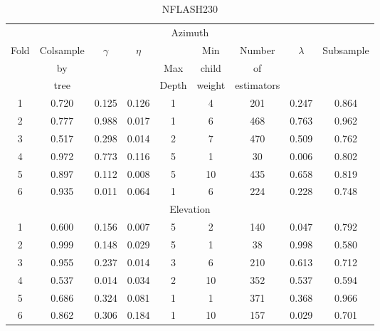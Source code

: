 \begin{table}[!htbp]
    \centering
    \caption{NFLASH230}
    \begin{tabular}{ccccccccc}
        \toprule
        \multicolumn{9}{c}{Azimuth} \\
        \cmidrule{1-9}
        \multirow{3}{*}{Fold} &  Colsample &  \multirow{3}{*}{$\gamma$} &  \multirow{3}{*}{$\eta$} &   &  Min &  Number &  \multirow{3}{*}{$\lambda$} &  \multirow{3}{*}{Subsample} \\
        & by   & & & Max   & child  & of         & & \\
        & tree & & & Depth & weight & estimators & & \\
        \midrule
        1 &      0.720 &  0.125 &          0.126 &      1 &             4 &       201 &       0.247 &      0.864 \\
        2 &      0.777 &  0.988 &          0.017 &      1 &             6 &       468 &       0.763 &      0.962 \\
        3 &      0.517 &  0.298 &          0.014 &      2 &             7 &       470 &       0.509 &      0.762 \\
        4 &      0.972 &  0.773 &          0.116 &      5 &             1 &        30 &       0.006 &      0.802 \\
        5 &      0.897 &  0.112 &          0.008 &      5 &            10 &       435 &       0.658 &      0.819 \\
        6 &      0.935 &  0.011 &          0.064 &      1 &             6 &       224 &       0.228 &      0.748 \\
        \hline
        \multicolumn{9}{c}{Elevation} \\
        \cmidrule{1-9}
        1 &      0.600 &  0.156 &          0.007 &      5 &             2 &       140 &       0.047 &      0.792 \\
        2 &      0.999 &  0.148 &          0.029 &      5 &             1 &        38 &       0.998 &      0.580 \\
        3 &      0.955 &  0.237 &          0.014 &      3 &             6 &       210 &       0.613 &      0.712 \\
        4 &      0.537 &  0.014 &          0.034 &      2 &            10 &       352 &       0.537 &      0.594 \\
        5 &      0.686 &  0.324 &          0.081 &      1 &             1 &       371 &       0.368 &      0.966 \\
        6 &      0.862 &  0.306 &          0.184 &      1 &            10 &       157 &       0.029 &      0.701 \\
        \bottomrule
        \end{tabular}
\end{table}


